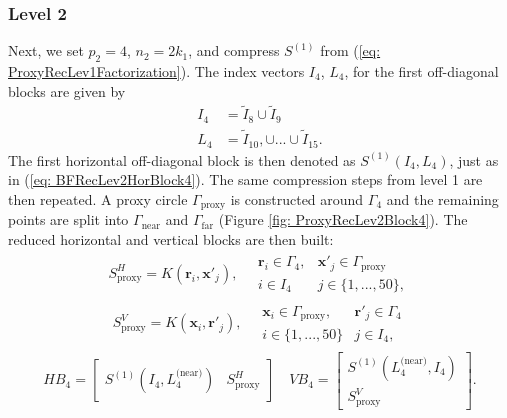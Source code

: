 \documentclass{sfuthesis}
\begin{document}
\subsubsection{Level 2}
Next, we set $p_2=4$, $n_2=2k_1$, and compress $S^{(1)}$ from (\ref{eq: ProxyRecLev1Factorization}). The index vectors $I_4$, $L_4$, for the first off-diagonal blocks are given by
\begin{align*}
	I_4&=\tilde{I}_8 \cup \tilde{I}_9\\
	L_4&=\tilde{I}_{10}, \cup ... \cup \tilde{I}_{15}.
\end{align*}
The first horizontal off-diagonal block is then denoted as $S^{(1)}(I_4, L_4)$, just as in (\ref{eq: BFRecLev2HorBlock4}). 
The same compression steps from level 1 are then repeated. 
A proxy circle $\Gamma_{\text{proxy}}$ is constructed around $\Gamma_4$ and the remaining points are split into $\Gamma_{\text{near}}$ and $\Gamma_{\text{far}}$ (Figure \ref{fig: ProxyRecLev2Block4}). 
The reduced horizontal and vertical blocks are then built: 
\begin{align*}
	S_{\text{proxy}}^H=K(\mathbf{r}_i, \mathbf{x}'_j), \quad \begin{array}{cc} 
	\mathbf{r}_i \in \Gamma_4, &\mathbf{x}'_j \in \Gamma_{\text{proxy}}\\
	i \in I_4 &j \in \{1, ..., 50\},
	\end{array}
\end{align*}
\begin{align*}
	S_{\text{proxy}}^V=K(\mathbf{x}_i, \mathbf{r}'_j), \quad \begin{array}{cc} 
	\mathbf{x}_i \in \Gamma_{\text{proxy}}, &\mathbf{r}'_j \in \Gamma_4\\
	i \in \{1, ..., 50\} &j \in I_4,
	\end{array}
\end{align*}
\begin{align*}
	HB_4=\left[\begin{array}{cc}
	S^{(1)}(I_4, L_4^{\text{(near)}}) & S_{\text{proxy}}^H
	\end{array}\right] \quad VB_4=\left[\begin{array}{c}
	S^{(1)}(L_4^{\text{(near)}}, I_4) \\ S_{\text{proxy}}^V
\end{array}\right].\\
\end{align*}
\end{document}
